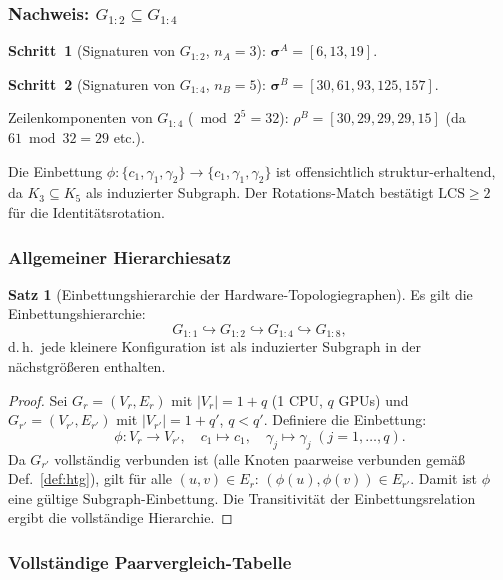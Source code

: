 ﻿\documentclass[a4paper,12pt]{article}
\theoremstyle{definition}
\newtheorem{satz}{Satz}
\begin{document}
\subsubsection{Nachweis: $G_{1:2} \subseteq G_{1:4}$}

\textbf{Schritt~1} (Signaturen von $G_{1:2}$, $n_A = 3$): $\boldsymbol{\sigma}^A = [6, 13, 19]$.

\textbf{Schritt~2} (Signaturen von $G_{1:4}$, $n_B = 5$): $\boldsymbol{\sigma}^B = [30, 61, 93, 125, 157]$.

Zeilenkomponenten von $G_{1:4}$ ($\bmod 2^5 = 32$):
$\rho^B = [30, 29, 29, 29, 15]$ (da $61 \bmod 32 = 29$ etc.).

Die Einbettung $\phi: \{c_1, \gamma_1, \gamma_2\} \to \{c_1, \gamma_1, \gamma_2\}$ ist offensichtlich struktur-erhaltend, da $K_3 \subseteq K_5$ als induzierter Subgraph. Der Rotations-Match best\"{a}tigt $\mathrm{LCS} \geq 2$ f\"{u}r die Identit\"{a}tsrotation.

\subsubsection{Allgemeiner Hierarchiesatz}

\begin{satz}[Einbettungshierarchie der Hardware-Topologiegraphen]
  \label{satz:hierarchie}
  Es gilt die Einbettungshierarchie:
  \[
    G_{1:1} \hookrightarrow G_{1:2} \hookrightarrow G_{1:4} \hookrightarrow G_{1:8},
  \]
  d.\,h.\ jede kleinere Konfiguration ist als induzierter Subgraph in der n\"{a}chstgr\"{o}{\ss}eren enthalten.
\end{satz}

\begin{proof}
  Sei $G_r = (V_r, E_r)$ mit $|V_r| = 1 + q$ (1 CPU, $q$ GPUs) und $G_{r'} = (V_{r'}, E_{r'})$ mit $|V_{r'}| = 1 + q'$, $q < q'$.
  Definiere die Einbettung:
  \[
    \phi: V_r \to V_{r'}, \quad c_1 \mapsto c_1, \quad \gamma_j \mapsto \gamma_j\; (j=1,\ldots,q).
  \]
  Da $G_{r'}$ vollst\"{a}ndig verbunden ist (alle Knoten paarweise verbunden gem\"{a}{\ss} Def.~\ref{def:htg}), gilt f\"{u}r alle $(u,v) \in E_r$: $(\phi(u),\phi(v)) \in E_{r'}$.
  Damit ist $\phi$ eine g\"{u}ltige Subgraph-Einbettung.
  Die Transitivit\"{a}t der Einbettungsrelation ergibt die vollst\"{a}ndige Hierarchie.
\end{proof}

\subsubsection{Vollst\"{a}ndige Paarvergleich-Tabelle}
\end{document}
